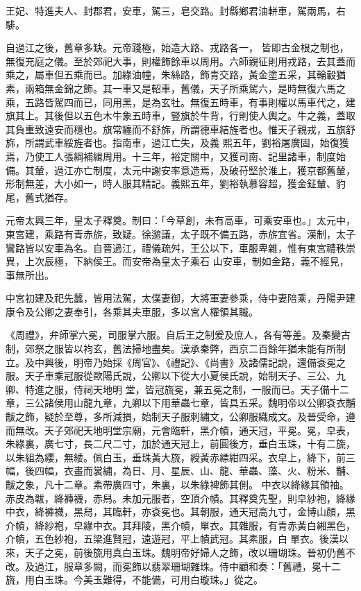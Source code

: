 \begin{pinyinscope}
 王妃、特進夫人、封郡君，安車，駕三，皂交路。封縣鄉君油軿車，駕兩馬，右騑。



 自過江之後，舊章多缺。元帝踐極，始造大路、戎路各一，
 皆即古金根之制也，無復充庭之儀。至於郊祀大事，則權飾餘車以周用。六師親征則用戎路，去其蓋而乘之，屬車但五乘而已。加綠油幢，朱絲路，飾青交路，黃金塗五采，其輪轂猶素，兩箱無金錦之飾。其一車又是軺車，舊儀，天子所乘駕六，是時無復六馬之乘，五路皆駕四而已，同用黑，是為玄牡。無復五時車，有事則權以馬車代之，建旗其上。其後但以五色木牛象五時車，豎旗於牛背，行則使人輿之。牛之義，蓋取其負重致遠安而穩也。旗常纏而不舒旆，所謂德車結旌者也。惟天子親戎，五旗舒旆，所謂武車綏旌者也。指南車，過江亡失，及義
 熙五年，劉裕屠廣固，始復獲焉，乃使工人張綱補緝周用。十三年，裕定關中，又獲司南、記里諸車，制度始備。其輦，過江亦亡制度，太元中謝安率意造焉，及破苻堅於淮上，獲京都舊輦，形制無差，大小如一，時人服其精記。義熙五年，劉裕執慕容超，獲金鉦輦、豹尾，舊式猶存。



 元帝太興三年，皇太子釋奠。制曰：「今草創，未有高車，可乘安車也。」太元中，東宮建，乘路有青赤旂，致疑。徐邈議，太子既不備五路，赤旂宜省。漢制，太子鸞路皆以安車為名。自晉過江，禮儀疏舛，王公以下，車服卑雜，惟有東宮禮秩崇異，上次辰極，下納侯王。而安帝為皇太子乘石
 山安車，制如金路，義不經見，事無所出。



 中宮初建及祀先蠶，皆用法駕，太僕妻御，大將軍妻參乘，侍中妻陪乘，丹陽尹建康令及公卿之妻奉引，各乘其夫車服，多以宮人權領其職。



 《周禮》，弁師掌六冕，司服掌六服。自后王之制爰及庶人，各有等差。及秦變古制，郊祭之服皆以袀玄，舊法掃地盡矣。漢承秦弊，西京二百餘年猶未能有所制立。及中興後，明帝乃始採《周官》、《禮記》、《尚書》及諸儒記說，還備袞冕之服。天子車乘冠服從歐陽氏說，公卿以下從大小夏侯氏說，始制天子、三公、九卿、特進之服，侍祠天地明
 堂，皆冠旒冕，兼五冕之制，一服而已。天子備十二章，三公諸侯用山龍九章，九卿以下用華蟲七章，皆具五采。魏明帝以公卿袞衣黼黻之飾，疑於至尊，多所減損，始制天子服刺繡文，公卿服織成文。及晉受命，遵而無改。天子郊祀天地明堂宗廟，元會臨軒，黑介幘，通天冠，平冕。冕，皁表，朱綠裏，廣七寸，長二尺二寸，加於通天冠上，前圓後方，垂白玉珠，十有二旒，以朱組為纓，無緌。佩白玉，垂珠黃大旒，綬黃赤縹紺四采。衣皁上，絳下，前三幅，後四幅，衣畫而裳繡，為日、月、星辰、山、龍、華蟲、藻、火、粉米、黼、黻之象，凡十二章。素帶廣四寸，朱裏，以朱綠裨飾其側。
 中衣以絳緣其領袖。赤皮為韍，絳褲襪，赤舄。未加元服者，空頂介幘。其釋奠先聖，則皁紗袍，絳緣中衣，絳褲襪，黑舄，其臨軒，亦袞冕也。其朝服，通天冠高九寸，金博山顏，黑介幘，絳紗袍，皁緣中衣。其拜陵，黑介幘，單衣。其雜服，有青赤黃白緗黑色，介幘，五色紗袍，五梁進賢冠，遠遊冠，平上幘武冠。其素服，白單衣。後漢以來，天子之冕，前後旒用真白玉珠。魏明帝好婦人之飾，改以珊瑚珠。晉初仍舊不改。及過江，服章多闕，而冕飾以翡翠珊瑚雜珠。侍中顧和奏：「舊禮，冕十二旒，用白玉珠。今美玉難得，不能備，可用白璇珠。」從之。




\end{pinyinscope}
